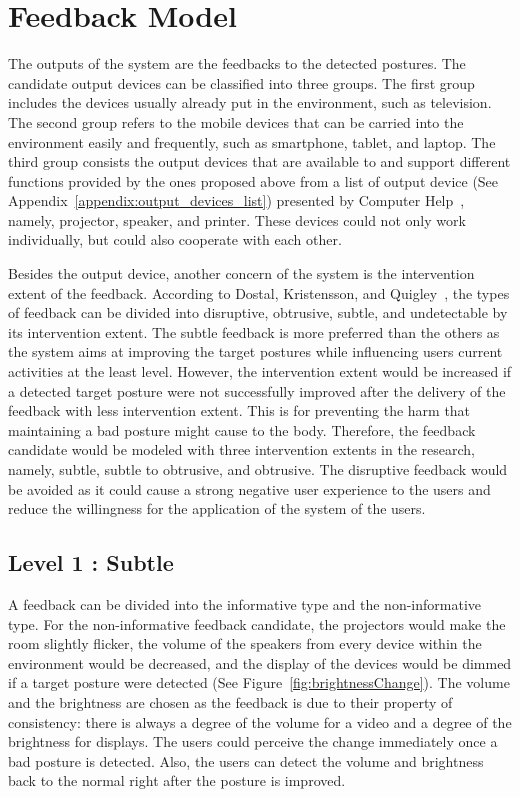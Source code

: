 \chapter{Feedback Model}
The outputs of the system are the feedbacks to the detected postures. The candidate output devices can be classified into three groups. The first group includes the devices usually already put in the environment, such as television. The second group refers to the mobile devices that can be carried into the environment easily and frequently, such as smartphone, tablet, and laptop. The third group consists the output devices that are available to and support different functions provided by the ones proposed above from a list of output device (See Appendix~\ref{appendix:output_devices_list}) presented by Computer Help~\cite{output_device}, namely, projector, speaker, and printer. These devices could not only work individually, but could also cooperate with each other.

Besides the output device, another concern of the system is the intervention extent of the feedback. According to Dostal, Kristensson, and Quigley~\cite{estimate_viewing_distance}, the types of feedback can be divided into disruptive, obtrusive, subtle, and undetectable by its intervention extent. The subtle feedback is more preferred than the others as the system aims at improving the target postures while influencing users current activities at the least level. However, the intervention extent would be increased if a detected target posture were not successfully improved after the delivery of the feedback with less intervention extent. This is for preventing the harm that maintaining a bad posture might cause to the body. Therefore, the feedback candidate would be modeled with three intervention extents in the research, namely, subtle, subtle to obtrusive, and obtrusive. The disruptive feedback would be avoided as it could cause a strong negative user experience to the users and reduce the willingness for the application of the system of the users.

\section{Level 1 : Subtle}
A feedback can be divided into the informative type and the non-informative type. For the non-informative feedback candidate, the projectors would make the room slightly flicker, the volume of the speakers from every device within the environment would be decreased, and the display of the devices would be dimmed if a target posture were detected (See Figure~\ref{fig:brightnessChange}). The volume and the brightness are chosen as the feedback is due to their property of consistency: there is always a degree of the volume for a video and a degree of the brightness for displays. The users could perceive the change immediately once a bad posture is detected. Also, the users can detect the volume and brightness back to the normal right after the posture is improved.

